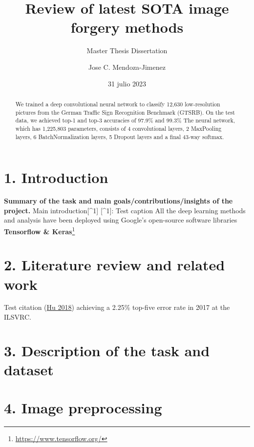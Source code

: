 \documentclass[
  11pt,
]{article}
\title{Review of latest SOTA image forgery methods}
\subtitle{Master Thesis Dissertation}
\author{Jose C. Mendoza-Jimenez}
\date{31 julio 2023}
\begin{document}
\maketitle
\begin{abstract}
We trained a deep convolutional neural network to classify 12,630
low-resolution pictures from the German Traffic Sign Recognition
Benchmark (GTSRB). On the test data, we achieved top-1 and top-3
accuracies of 97.9\% and 99.3\% The neural network, which has 1,225,803
parameters, consists of 4 convolutional layers, 2 MaxPooling layers, 6
BatchNormalization layers, 5 Dropout layers and a final 43-way softmax.
\end{abstract}

{
\setcounter{tocdepth}{2}
\tableofcontents
}
\pagebreak

\hypertarget{intro}{%
\section{1. Introduction}\label{intro}}

\textbf{Summary of the task and main goals/contributions/insights of the
project.} Main introduction{[}\^{}1{]} {[}\^{}1{]}: Test caption All the
deep learning methods and analysis have been deployed using Google's
open-source software libraries \textbf{Tensorflow \& Keras}\footnote{\url{https://www.tensorflow.org/}}

\hypertarget{sec:literature}{%
\section{2. Literature review and related work}\label{sec:literature}}

Test citation (\protect\hyperlink{ref-senet}{Hu 2018}) achieving a
2.25\% top-five error rate in 2017 at the ILSVRC.

\pagebreak

\hypertarget{description-of-the-task-and-dataset}{%
\section{3. Description of the task and
dataset}\label{description-of-the-task-and-dataset}}

\pagebreak

\hypertarget{image-preprocessing}{%
\section{4. Image preprocessing}\label{image-preprocessing}}
\end{document}
